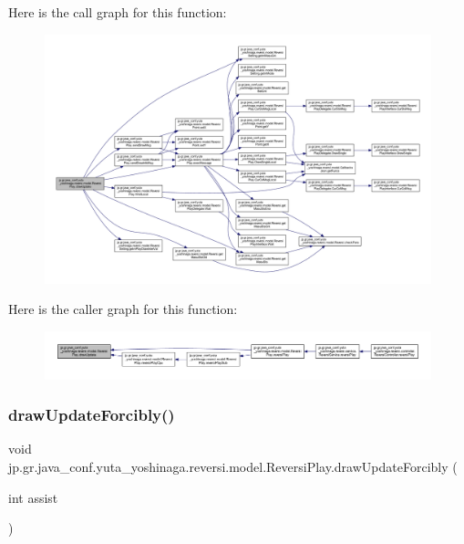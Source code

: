 Here is the call graph for this function\+:
\nopagebreak
\begin{figure}[H]
\begin{center}
\leavevmode
\includegraphics[width=350pt]{classjp_1_1gr_1_1java__conf_1_1yuta__yoshinaga_1_1reversi_1_1model_1_1_reversi_play_a0522dfef43ea5a95aaa2086c22fcefe0_cgraph}
\end{center}
\end{figure}
Here is the caller graph for this function\+:
\nopagebreak
\begin{figure}[H]
\begin{center}
\leavevmode
\includegraphics[width=350pt]{classjp_1_1gr_1_1java__conf_1_1yuta__yoshinaga_1_1reversi_1_1model_1_1_reversi_play_a0522dfef43ea5a95aaa2086c22fcefe0_icgraph}
\end{center}
\end{figure}
\mbox{\label{classjp_1_1gr_1_1java__conf_1_1yuta__yoshinaga_1_1reversi_1_1model_1_1_reversi_play_a216cece80255198785a95ccbaf1cef53}} 
\subsubsection{\texorpdfstring{draw\+Update\+Forcibly()}{drawUpdateForcibly()}}
{\footnotesize\ttfamily void jp.\+gr.\+java\+\_\+conf.\+yuta\+\_\+yoshinaga.\+reversi.\+model.\+Reversi\+Play.\+draw\+Update\+Forcibly (\begin{DoxyParamCaption}\item[{int}]{assist }\end{DoxyParamCaption})}



